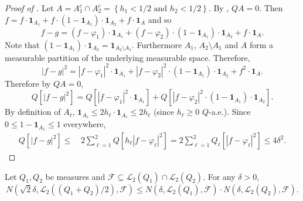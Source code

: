 \begin{proof}[Proof of ]
Let \(A = A_{1}^{c} \cap A_{2}^{c} = \left\{ h_{1} < 1 / 2 \text{ and } h_{2} <
1 / 2 \right\}\).
By , \(Q A = 0\).
Then \(f = f \cdot \mathbf{1}_{A_{1}} + f \cdot
\left( 1 - \mathbf{1}_{A_{1}} \right) \cdot \mathbf{1}_{A_{2}} + f \cdot
\mathbf{1}_{A}\) and so
\begin{equation*}
  f - g = \left( f - \varphi_{1} \right) \cdot \mathbf{1}_{A_{1}} + \left( f -
  \varphi_{2} \right) \cdot \left( 1 - \mathbf{1}_{A_{1}} \right) \cdot
  \mathbf{1}_{A_{2}} + f \cdot \mathbf{1}_{A}.
\end{equation*}
Note that \(\left( 1 - \mathbf{1}_{A_{1}} \right) \cdot \mathbf{1}_{A_{2}} =
\mathbf{1}_{A_{2} \setminus A_{1}}\).
Furthermore \(A_{1}\), \(A_{2} \setminus A_{1}\) and \(A\) form a measurable
partition of the underlying measurable space.
Therefore,
\begin{equation*}
  \left| f - g \right|^{2} = \left| f - \varphi_{1} \right|^{2} \cdot
  \mathbf{1}_{A_{1}} + \left| f - \varphi_{2} \right|^{2} \cdot \left( 1 -
  \mathbf{1}_{A_{1}} \right) \cdot \mathbf{1}_{A_{2}} + f^{2} \cdot
  \mathbf{1}_{A}.
\end{equation*}
Therefore by \(Q A = 0\),
\begin{equation*}
  Q \left[ \left| f - g \right|^{2} \right] = Q \left[ \left| f - \varphi_{1}
  \right|^{2} \cdot \mathbf{1}_{A_{1}} \right] + Q \left[ \left| f - \varphi_{2}
  \right|^{2} \cdot \left( 1 - \mathbf{1}_{A_{1}} \right) \cdot
  \mathbf{1}_{A_{2}} \right].
\end{equation*}
By definition of \(A_{\ell}\), \(\mathbf{1}_{A_{\ell}} \leq 2 h_{\ell} \cdot
\mathbf{1}_{A_{\ell}} \leq 2 h_{\ell}\) (since \(h_{\ell} \geq 0\) \(Q\)-a.e.).
Since \(0 \leq 1 - \mathbf{1}_{A_{1}} \leq 1\) everywhere,
\begin{align*}
  Q \left[ \left| f - g \right|^{2} \right] \leq
  & \, 2 \sum_{\ell = 1}^{2} Q \left[ h_{\ell} \left| f - \varphi_{\ell}
  \right|^{2} \right] = 2 \sum_{\ell = 1}^{2} Q_{\ell} \left[ \left| f -
  \varphi_{\ell} \right|^{2} \right] \leq 4 \delta^{2}.
\end{align*}
\end{proof}

\begin{lemma}
\label{lem--L2-mixture-meas-cover}
Let \(Q_{1}, Q_{2}\) be measures and \(\mathcal{F} \subseteq \mathscr{L}_{2}
\left( Q_{1} \right) \cap \mathscr{L}_{2} \left( Q_{2} \right)\).
For any \(\delta > 0\),
\begin{equation*}
  N \left( \sqrt{2} \delta, \mathscr{L}_{2} \left( \left( Q_{1} + Q_{2} \right)
  / 2 \right), \mathcal{F} \right) \leq N \left( \delta, \mathscr{L}_{2} \left(
  Q_{1} \right), \mathcal{F} \right) \cdot N \left( \delta, \mathscr{L}_{2}
  \left( Q_{2} \right), \mathcal{F} \right).
\end{equation*}
\end{lemma}

